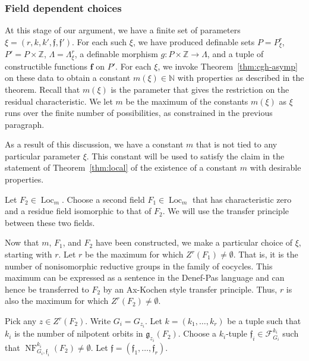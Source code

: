 \documentclass[12pt]{amsart}
\newcommand{\op}[1]{\operatorname{#1}}
\newcommand{\ring}[1]{{\mathbb #1}}
\def\NF{\op{NF}}
\def\s{{\mathfrak{f}}}
\def\bf{\mathbf f}
\newcommand{\cF}{\mathcal{F}}
\newcommand{\fg}{\mathfrak{g}}
\theoremstyle{plain}
\theoremstyle{definition}
\begin{document}
\subsubsection{Field dependent choices}\label{sec:field}

At this stage of our argument, we have a finite set of parameters
$\xi=(r,k,k',\s,\s')$.  For each such $\xi$, we have produced
definable sets $P=P^r_\xi$, $P'=P\times\ring{Z}$,
$\Lambda=\Lambda^r_\xi$, a definable morphism $g:P\times\ring{Z}\to
\Lambda$, and a tuple of constructible functions $\bf$ on $P'$.  For
each $\xi$, we invoke Theorem~\ref{thm:cgh-asymp} on these data to
obtain a constant $m(\xi)\in\ring{N}$ with properties as described in
the theorem.  Recall that $m(\xi)$ is the parameter that gives the
restriction on the residual characteristic.  
We let $m$ be the maximum of the constants $m(\xi)$ as
$\xi$ runs over the finite number of possibilities, as constrained in
the previous paragraph.

As a result of this discussion, we have a constant $m$ that is not
tied to any particular parameter $\xi$.  This constant will be used to
satisfy the claim in the statement of Theorem~\ref{thm:local} of the
existence of a constant $m$ with desirable properties.

Let $F_2\in\op{Loc}_m$.  Choose a second field $F_1\in \op{Loc}_m$
that has characteristic zero and a residue field isomorphic to that of
$F_2$.  We will use the transfer principle between these two fields.

Now that $m$, $F_1$, and $F_2$ have been constructed, we make a
particular choice of $\xi$, starting with $r$.
Let $r$ be the maximum for which $Z^r(F_1)\ne\emptyset$.  That is, it is
the number of nonisomorphic reductive groups in the family of
cocycles.  This maximum can be expressed as a sentence in the Denef-Pas
language and can hence be transferred to $F_2$ by an Ax-Kochen style
transfer principle.  Thus, $r$ is also the maximum for which
$Z^r(F_2)\ne\emptyset$.


Pick any $z\in Z^r(F_2)$.  Write $G_i=G_{z_i}$.  Let
$k=(k_1,\ldots,k_r)$ be a tuple such that $k_i$ is the number of
nilpotent orbits in $\fg_{z_i}(F_2)$.  Choose a $k_i$-tuple $\s_i\in
\cF_{G_i}^{k_i}$ such that $\NF^{k_i}_{G_i,\s_i}(F_2)\ne \emptyset$.
Let $\s = (\s_1,\ldots,\s_r)$.
\end{document}
